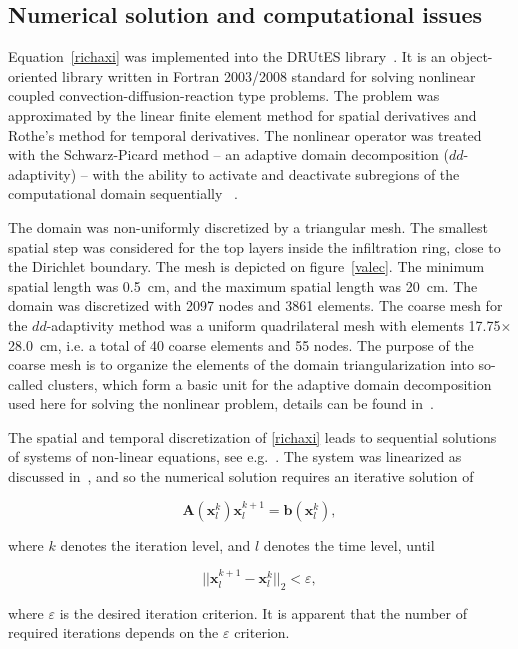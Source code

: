 \documentclass[review,times,3p,10pt]{elsarticle}
\newenvironment{lineq}
    {\begin{linenomath*}
    \begin{equation}
    }
    { 
    \end{equation} 
    \end{linenomath*}
    }
\renewcommand{\vec}{\mathbf}
\begin{document}
\subsection{Numerical solution and computational issues}
\label{trapoty}

Equation~\eqref{richaxi} was implemented into the DRUtES library~\citep{drutes}. It is an object-oriented library written in Fortran 2003/2008 standard for solving nonlinear coupled convection-diffusion-reaction type problems. The problem was approximated by the linear finite element method for spatial derivatives and Rothe's method for temporal derivatives. The nonlinear operator was treated with the Schwarz-Picard method -- an adaptive domain decomposition  ($dd$-adaptivity) -- with the ability to activate and deactivate subregions of the computational domain sequentially ~\citep{mojecomp, mojejcam2, mojeamc2}.



 The domain was non-uniformly discretized by a triangular mesh. The smallest spatial step was considered for the top layers inside the infiltration ring, close to the Dirichlet boundary. The mesh is depicted on figure~\ref{valec}. The minimum spatial length was 0.5~cm, and the maximum spatial length was 20~cm. The domain was discretized with 2097 nodes and 3861 elements. The coarse mesh for the $dd$-adaptivity method was a uniform quadrilateral mesh with elements 17.75$\times$28.0~cm, i.e. a total of 40 coarse elements and 55 nodes. The purpose of the coarse mesh is to organize the elements of the domain triangularization into so-called clusters, which form a basic unit for the adaptive domain decomposition used here for solving the nonlinear problem, details can be found in~\citep{mojeamc2}.

 
 The spatial and temporal discretization of \eqref{richaxi} leads to sequential solutions of systems of non-linear equations, see e.g.~\citep{mojecomp}. The system was linearized as discussed in~\citet{mojeacta, mojeamc}, and so the numerical solution requires an iterative solution of 
\begin{lineq}
\label{matice}
\mathbf{A}(\vec{x}_l^k) \vec{x}_l^{k+1} = \vec{b}(\vec{x}_l^k),
\end{lineq}
where $k$ denotes the iteration level, and $l$ denotes the time level, until \begin{lineq} \label{picard} ||\vec{x}_l^{k+1} - \vec{x}_l^k||_2 < \varepsilon , \end{lineq} where $\varepsilon$ is the desired iteration criterion.  It is apparent that the number of required  iterations depends on the $\varepsilon$ criterion. 
\end{document}
